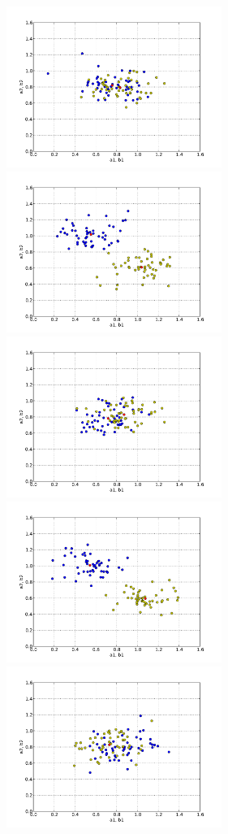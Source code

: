 \begin{figure}
  \begin{center}
    \includegraphics[width=7cm]{chapters/schroll/pdf/4Dsample1-5.pdf}
    \includegraphics[width=7cm]{chapters/schroll/pdf/4Dsample1b-5.pdf}
    \includegraphics[width=7cm]{chapters/schroll/pdf/4Dsample2-5.pdf}
    \includegraphics[width=7cm]{chapters/schroll/pdf/4Dsample2b-5.pdf}
    \includegraphics[width=7cm]{chapters/schroll/pdf/4Dsample3-5.pdf}

\end{center}
\end{figure}
